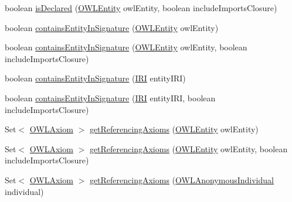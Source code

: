 \begin{DoxyCompactItemize}
\item 
boolean \hyperlink{classuk_1_1ac_1_1manchester_1_1cs_1_1owl_1_1owlapi_1_1_o_w_l_ontology_impl_aa160c4deb6cf6acbea53961d87e2078b}{is\-Declared} (\hyperlink{interfaceorg_1_1semanticweb_1_1owlapi_1_1model_1_1_o_w_l_entity}{O\-W\-L\-Entity} owl\-Entity, boolean include\-Imports\-Closure)
\item 
boolean \hyperlink{classuk_1_1ac_1_1manchester_1_1cs_1_1owl_1_1owlapi_1_1_o_w_l_ontology_impl_a2cc32f99366ba120b47b839a73807b63}{contains\-Entity\-In\-Signature} (\hyperlink{interfaceorg_1_1semanticweb_1_1owlapi_1_1model_1_1_o_w_l_entity}{O\-W\-L\-Entity} owl\-Entity)
\item 
boolean \hyperlink{classuk_1_1ac_1_1manchester_1_1cs_1_1owl_1_1owlapi_1_1_o_w_l_ontology_impl_ad9279129826bd4cf7140e12358a611b5}{contains\-Entity\-In\-Signature} (\hyperlink{interfaceorg_1_1semanticweb_1_1owlapi_1_1model_1_1_o_w_l_entity}{O\-W\-L\-Entity} owl\-Entity, boolean include\-Imports\-Closure)
\item 
boolean \hyperlink{classuk_1_1ac_1_1manchester_1_1cs_1_1owl_1_1owlapi_1_1_o_w_l_ontology_impl_ae8f49050012a241e858c8065dfe73e8f}{contains\-Entity\-In\-Signature} (\hyperlink{classorg_1_1semanticweb_1_1owlapi_1_1model_1_1_i_r_i}{I\-R\-I} entity\-I\-R\-I)
\item 
boolean \hyperlink{classuk_1_1ac_1_1manchester_1_1cs_1_1owl_1_1owlapi_1_1_o_w_l_ontology_impl_a17bbc55ff1ece62d711deabbd9f33882}{contains\-Entity\-In\-Signature} (\hyperlink{classorg_1_1semanticweb_1_1owlapi_1_1model_1_1_i_r_i}{I\-R\-I} entity\-I\-R\-I, boolean include\-Imports\-Closure)
\item 
Set$<$ \hyperlink{interfaceorg_1_1semanticweb_1_1owlapi_1_1model_1_1_o_w_l_axiom}{O\-W\-L\-Axiom} $>$ \hyperlink{classuk_1_1ac_1_1manchester_1_1cs_1_1owl_1_1owlapi_1_1_o_w_l_ontology_impl_a73ec2680cea84db64dc653937b61c9ea}{get\-Referencing\-Axioms} (\hyperlink{interfaceorg_1_1semanticweb_1_1owlapi_1_1model_1_1_o_w_l_entity}{O\-W\-L\-Entity} owl\-Entity)
\item 
Set$<$ \hyperlink{interfaceorg_1_1semanticweb_1_1owlapi_1_1model_1_1_o_w_l_axiom}{O\-W\-L\-Axiom} $>$ \hyperlink{classuk_1_1ac_1_1manchester_1_1cs_1_1owl_1_1owlapi_1_1_o_w_l_ontology_impl_a1a48d1fd1be6f7f7ab0b42b1b8ab05d7}{get\-Referencing\-Axioms} (\hyperlink{interfaceorg_1_1semanticweb_1_1owlapi_1_1model_1_1_o_w_l_entity}{O\-W\-L\-Entity} owl\-Entity, boolean include\-Imports\-Closure)
\item 
Set$<$ \hyperlink{interfaceorg_1_1semanticweb_1_1owlapi_1_1model_1_1_o_w_l_axiom}{O\-W\-L\-Axiom} $>$ \hyperlink{classuk_1_1ac_1_1manchester_1_1cs_1_1owl_1_1owlapi_1_1_o_w_l_ontology_impl_a155117dda2acbb729b3f36f0b1ad2bc9}{get\-Referencing\-Axioms} (\hyperlink{interfaceorg_1_1semanticweb_1_1owlapi_1_1model_1_1_o_w_l_anonymous_individual}{O\-W\-L\-Anonymous\-Individual} individual)

\end{DoxyCompactItemize}
